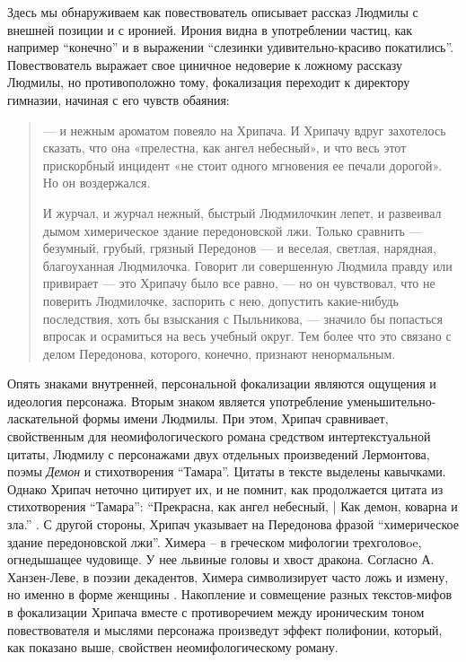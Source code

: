 \documentclass[12pt,a4paper]{article}
\begin{document}
Здесь мы обнаруживаем как повествователь описывает рассказ Людмилы с внешней позиции и с иронией. Ирония видна в употреблении частиц, как например \enquote{конечно} и в выражении \enquote{слезинки удивительно-красиво покатились}. Повествователь выражает свое циничное недоверие к ложному рассказу Людмилы, но противоположно тому, фокализация переходит к директору гимназии, начиная с его чувств обаяния:

\begin{quote}

— и нежным ароматом повеяло на Хрипача. И Хрипачу
вдруг захотелось сказать, что она «прелестна, как ангел небесный», и
что весь этот прискорбный инцидент «не стоит одного мгновения ее
печали дорогой». Но он воздержался.

И журчал, и журчал нежный, быстрый Людмилочкин лепет, и
развеивал дымом химерическое здание передоновской лжи. Только
сравнить — безумный, грубый, грязный Передонов — и веселая, светлая,
нарядная, благоуханная Людмилочка. Говорит ли совершенную
Людмила правду или привирает — это Хрипачу было все равно, — но он
чувствовал, что не поверить Людмилочке, заспорить с нею, допустить
какие-нибудь последствия, хоть бы взыскания с Пыльникова, — значило
бы попасться впросак и осрамиться на весь учебный округ. Тем более
что это связано с делом Передонова, которого, конечно, признают
ненормальным.

\parencite[240.]{sologub2004}
\end{quote}

Опять знаками внутренней, персональной фокализации являются ощущения и идеология персонажа. Вторым знаком является употребление уменьшительно-ласкательной формы имени Людмилы.  При этом, Хрипач сравнивает, свойственным для неомифологического романа средством интертекстуальной цитаты, Людмилу с персонажами двух отдельных произведений Лермонтова, поэмы \emph{Демон} и стихотворения \enquote{Тамара}. Цитаты в тексте выделены кавычками. Однако Хрипач неточно цитирует их, и не помнит, как продолжается цитата из стихотворения \enquote{Тамара}: \enquote{Прекрасна, как ангел небесный, | Как демон, коварна и зла.} \parencite[194]{lermontov2000}. С другой стороны, Хрипач указывает на Передонова фразой \enquote{химерическое здание передоновской лжи}. Химера – в греческом мифологии трехголовoe, огнедышащее чудовище. У нее львиные головы и хвост дракона. Согласно А. Ханзен-Леве, в поэзии декадентов, Химера символизирует часто ложь и измену, но именно в форме женщины \parencite[200]{hansen-love1999}. Накопление и совмещение разных текстов-мифов в фокализации Хрипача вместе с противоречием между ироническим тоном повествователя и мыслями персонажа произведут эффект полифонии, который, как показано выше, свойствен неомифологическому роману.
\end{document}
